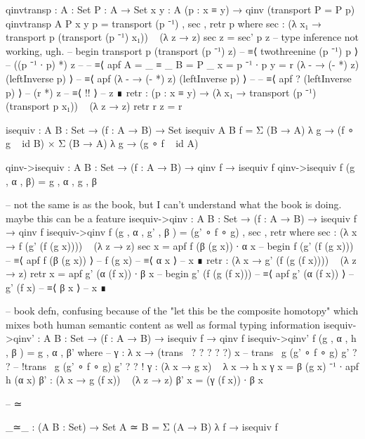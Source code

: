 \documentclass[11pt, a4paper]{article}
\begin{document}
\begin{code}
  qinvtransp : {A : Set} {P : A → Set} {x y : A} (p : x ≡ y) → qinv (transport {P = P} p)
  qinvtransp {A} {P} {x} {y} p = transport (p ⁻¹) , sec , retr p
    where
      sec : (λ x₁ → transport p (transport (p ⁻¹) x₁)) ~ (λ z → z)
      sec z = sec' p z 
              -- type inference not working, ugh.
              -- begin transport p (transport (p ⁻¹) z)
              -- ≡⟨ twothreenine (p ⁻¹) p ⟩
              -- ((p ⁻¹ ∙ p) *) z
              -- -- ≡⟨ apf {A = _ ≡ _} {B = P _} {x = p ⁻¹ ∙ p} {y = r} (λ - → (- *) z) (leftInverse p) ⟩
              -- ≡⟨ apf (λ - → (- *) z) (leftInverse p) ⟩
              -- -- ≡⟨ apf ? (leftInverse p) ⟩
              -- (r *) z 
              -- ≡⟨ {!!} ⟩
              -- z ∎
      retr : (p : x ≡ y) → (λ x₁ → transport (p ⁻¹) (transport p x₁)) ~ (λ z → z)
      retr r z = r

  isequiv : {A B : Set} → (f : A → B) → Set 
  isequiv {A} {B} f = Σ (B → A) λ g → (f ∘ g ~ id {B}) ×  Σ (B → A) λ g → (g ∘ f ~ id {A})

  qinv->isequiv : {A B : Set} → (f : A → B) → qinv f → isequiv f
  qinv->isequiv f (g , α , β) = g , α , g , β

  -- not the same is as the book, but I can't understand what the book is doing.  maybe this can be a feature
  isequiv->qinv : {A B : Set} → (f : A → B) →  isequiv f → qinv f 
  isequiv->qinv f (g , α , g' , β ) = (g' ∘ f ∘ g) , sec , retr
    where
      sec : (λ x → f (g' (f (g x)))) ~ (λ z → z)
      sec x = apf f (β (g x)) ∙ α x
        -- begin f (g' (f (g x)))
        --   ≡⟨ apf f (β (g x)) ⟩
        -- f (g x)
        --   ≡⟨ α x ⟩
        -- x ∎
      retr : (λ x → g' (f (g (f x)))) ~ (λ z → z)
      retr x = apf g' (α (f x)) ∙ β x
        -- begin g' (f (g (f x)))
        -- ≡⟨ apf g' (α (f x)) ⟩
        -- g' (f x)
        -- ≡⟨ β x ⟩
        -- x ∎

  -- book defn, confusing because of the "let this be the composite homotopy" which mixes both human semantic content as well as formal typing information
  isequiv->qinv' : {A B : Set} → (f : A → B) →  isequiv f → qinv f 
  isequiv->qinv' f (g , α , h , β ) = g , α , β'
    where
      -- γ : λ x → (trans~ ? ? ? ? ?) x -- trans~ g (g' ∘ f ∘ g) g' ? ? -- {!trans~ g (g' ∘ f ∘ g) g' ? ? !}
      γ : (λ x → g x) ~ λ x → h x 
      γ x = β (g x) ⁻¹ ∙ apf h (α x)
      β' : (λ x → g (f x)) ~ (λ z → z)
      β' x = (γ (f x)) ∙ β x

  -- \simeq ≃

  _≃_ : (A B : Set) → Set
  A ≃ B = Σ (A → B) λ f → isequiv f



\end{code}
\end{document}
